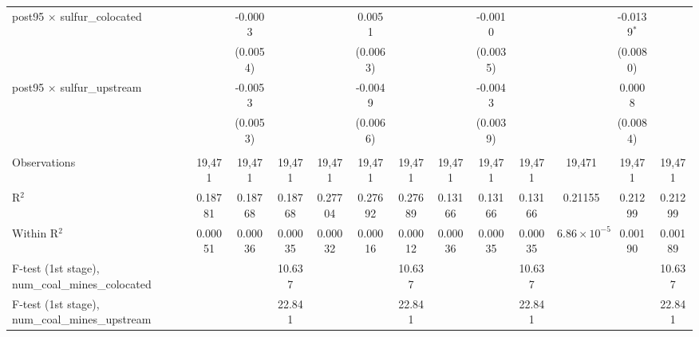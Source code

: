 \begin{table}[htbp]
\begin{adjustbox}{width = \textwidth, center}
\begin{tabular}{lcccccccccccc}
         post95 $\times$ sulfur\_colocated                  &               & -0.0003       &               &               & 0.0051        &               &               & -0.0010       &               &                       & -0.0139$^{*}$ &   \\   
                                                            &               & (0.0054)      &               &               & (0.0063)      &               &               & (0.0035)      &               &                       & (0.0080)      &   \\   
         post95 $\times$ sulfur\_upstream                   &               & -0.0053       &               &               & -0.0049       &               &               & -0.0043       &               &                       & 0.0008        &   \\   
                                                            &               & (0.0053)      &               &               & (0.0066)      &               &               & (0.0039)      &               &                       & (0.0084)      &   \\   
          \\
         Observations                                       & 19,471        & 19,471        & 19,471        & 19,471        & 19,471        & 19,471        & 19,471        & 19,471        & 19,471        & 19,471                & 19,471        & 19,471\\  
         R$^2$                                              & 0.18781       & 0.18768       & 0.18768       & 0.27704       & 0.27692       & 0.27689       & 0.13166       & 0.13166       & 0.13166       & 0.21155               & 0.21299       & 0.21299\\  
         Within R$^2$                                       & 0.00051       & 0.00036       & 0.00035       & 0.00032       & 0.00016       & 0.00012       & 0.00036       & 0.00035       & 0.00035       & $6.86\times 10^{-5}$  & 0.00190       & 0.00189\\  
         F-test (1st stage), num\_coal\_mines\_colocated    &               &               & 10.637        &               &               & 10.637        &               &               & 10.637        &                       &               & 10.637\\  
         F-test (1st stage), num\_coal\_mines\_upstream     &               &               & 22.841        &               &               & 22.841        &               &               & 22.841        &                       &               & 22.841\\  

\end{tabular}
\end{adjustbox}
\end{table}
